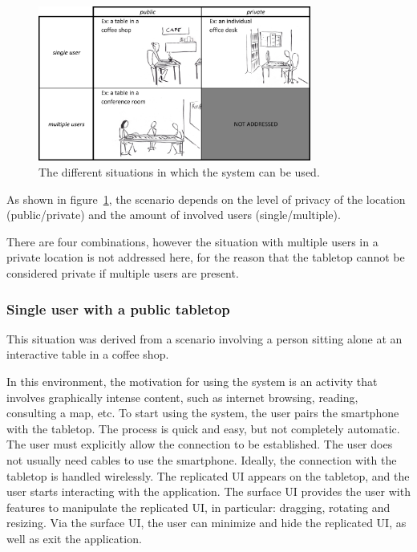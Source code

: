 \begin{figure}[htb]
  \centering
    \includegraphics[width=0.8\textwidth]{images/marietable}
    \caption{The different situations in which the system can be used.}
    \label{fig:scenarios}
\end{figure}

As shown in figure~\ref{fig:scenarios}, the scenario depends on the level of privacy of the location (public/private) and the amount of involved users (single/multiple).

There are four combinations, however the situation with multiple users in a private location is not addressed here, for the reason that the tabletop cannot be considered private if multiple users are present.

\subsubsection{Single user with a public tabletop}

This situation was derived from a scenario involving a person sitting alone at an interactive table in a coffee shop.

In this environment, the motivation for using the system is an activity that involves graphically intense content, such as 
internet browsing, reading, consulting a map, etc.
To start using the system, the user pairs the smartphone with the tabletop.
The process is quick and easy, but not completely automatic.
The user must explicitly allow the connection to be established.
The user does not usually need cables to use the smartphone.
Ideally, the connection with the tabletop is handled wirelessly.
The replicated UI appears on the tabletop, and the user starts interacting with the application.
The surface UI provides the user with features to manipulate the replicated UI, in particular: dragging, rotating and resizing.
Via the surface UI, the user can minimize and hide the replicated UI, as well as exit the application.

